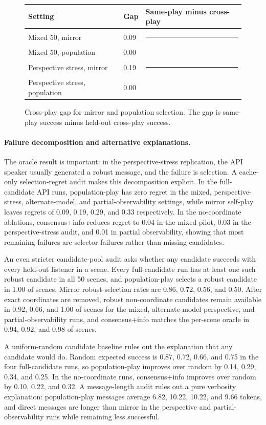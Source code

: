 \begin{figure}[H]
\centering
\begin{tabular}{lll}
\toprule
Setting & Gap & Same-play minus cross-play \\
\midrule
Mixed 50, mirror & 0.09 & \rule{0.93cm}{6pt} \\
Mixed 50, population & 0.00 &  \\
Perspective stress, mirror & 0.19 & \rule{1.87cm}{6pt} \\
Perspective stress, population & 0.00 &  \\
\bottomrule
\end{tabular}
\caption{Cross-play gap for mirror and population selection. The gap is same-play success minus held-out cross-play success.}
\label{fig:gaps}
\end{figure}

\paragraph{Failure decomposition and alternative explanations.}
The oracle result is important: in the perspective-stress replication, the API speaker usually generated a robust message, and the failure is selection. A cache-only selection-regret audit makes this decomposition explicit. In the full-candidate API runs, population-play has zero regret in the mixed, perspective-stress, alternate-model, and partial-observability settings, while mirror self-play leaves regrets of 0.09, 0.19, 0.29, and 0.33 respectively. In the no-coordinate ablations, consensus+info reduces regret to 0.04 in the mixed pilot, 0.03 in the perspective-stress audit, and 0.01 in partial observability, showing that most remaining failures are selector failures rather than missing candidates.

An even stricter candidate-pool audit asks whether any candidate succeeds with every held-out listener in a scene. Every full-candidate run has at least one such robust candidate in all 50 scenes, and population-play selects a robust candidate in 1.00 of scenes. Mirror robust-selection rates are 0.86, 0.72, 0.56, and 0.50. After exact coordinates are removed, robust non-coordinate candidates remain available in 0.92, 0.66, and 1.00 of scenes for the mixed, alternate-model perspective, and partial-observability runs, and consensus+info matches the per-scene oracle in 0.94, 0.92, and 0.98 of scenes.

A uniform-random candidate baseline rules out the explanation that any candidate would do. Random expected success is 0.87, 0.72, 0.66, and 0.75 in the four full-candidate runs, so population-play improves over random by 0.14, 0.29, 0.34, and 0.25. In the no-coordinate runs, consensus+info improves over random by 0.10, 0.22, and 0.32. A message-length audit rules out a pure verbosity explanation: population-play messages average 6.82, 10.22, 10.22, and 9.66 tokens, and direct messages are longer than mirror in the perspective and partial-observability runs while remaining less successful.


